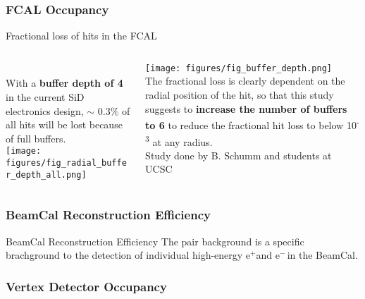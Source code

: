 \documentclass[xcolor={dvipsnames}]{beamer}
\newcommand{\electron}{e$^-$}
\newcommand{\positron}{e$^+$}
\begin{document}
\subsubsection{FCAL Occupancy}
\begin{frame}{Fractional loss of hits in the FCAL}
  \begin{columns}
   \begin{column}{0.52\textwidth}
     \vspace*{0.5cm}\\
     With a \textbf{buffer depth of 4} in the current SiD electronics design, $\sim$ 0.3\% of all hits will be lost because of full buffers.\\
     \vspace*{1cm}
     \texttt{[image: figures/fig\_radial\_buffer\_depth\_all.png]}
   \end{column}
   \begin{column}{0.52\textwidth}
     \texttt{[image: figures/fig\_buffer\_depth.png]}\\
     The fractional loss is clearly dependent on the radial position of the hit, so that this study suggests to \textbf{increase the number of buffers to 6} to reduce the fractional hit loss to below 10\textsuperscript{-3} at any radius.\\
    {\hfill \tiny Study done by B. Schumm and students at UCSC}
   \end{column}
  \end{columns}
\end{frame}

\subsubsection{BeamCal Reconstruction Efficiency}
\begin{frame}{BeamCal Reconstruction Efficiency}
 The pair background is a specific brachground to the detection of individual high-energy \positron and \electron \,in the BeamCal.
\end{frame}


\subsubsection{Vertex Detector Occupancy}
\end{document}
